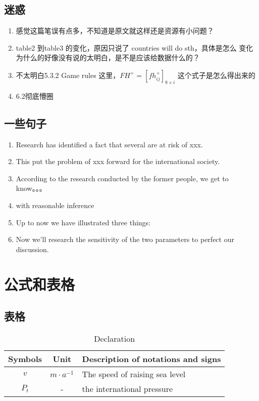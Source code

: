 \documentclass{mcmthesis}
\begin{document}
\subsection{迷惑}
\begin{enumerate}
  \item 感觉这篇笔误有点多，不知道是原文就这样还是资源有小问题？
  \item table2 到table3 的变化，原因只说了 countries will do sth，具体是怎么
        变化为什么的好像没有说的太明白，是不是应该给数据什么的？
  \item 不太明白5.3.2 Game rules 这里，$FH^+ = [fh^{+}_{ij}]_{8\times i}$ 
        这个式子是怎么得出来的
  \item 6.2彻底懵圈
\end{enumerate}

\subsection{一些句子}
\begin{enumerate}[(1)]
  \item Research has identified a fact that several are at risk of xxx. 
  \item This put the problem of xxx forward for the international society.
  \item According to the research conducted by the former people, we get to know。。。
  \item with reasonable inference
  \item Up to now we have illustrated three things:
  \item Now we’ll research the sensitivity of the two parameters to perfect our
  discussion.
\end{enumerate}
  
\section{公式和表格}

\subsection{表格}
\begin{table}[htbp] 
  \setlength{\abovecaptionskip}{-10pt}   %
  \setlength{\belowcaptionskip}{10pt}
  \centering
	\caption{\label{tab:test}Declaration}  %
		\begin{tabular}{ccl} %
 		\toprule %
     Symbols & Unit & Description of notations and signs \\ 
  	\midrule %
 		$v$ & $m \cdot a^{-1} $ & The speed of raising sea level \\ 
 		$P_t$ & - &  the international pressure \\ 
  \bottomrule %
 \end{tabular} 
\end{table}
\end{document}
